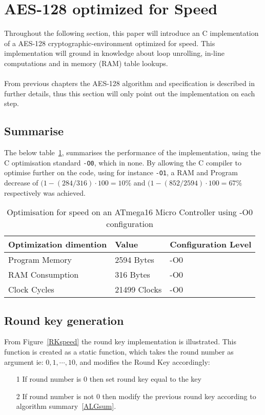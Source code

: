 \documentclass[Report.tex]{subfiles}
\begin{document}
\section{AES-128 optimized for Speed}
Throughout the following section, this paper will introduce 
an C implementation of a AES-128 cryptographic-environment optimized for speed.
This implementation will ground in knowledge about loop unrolling, in-line computations
and in memory (RAM) table lookups.
\\\\\noindent
From previous chapters the AES-128 algorithm and specification is described in further details,
thus this section will only point out the implementation on each step.

\subsection{Summarise}
The below table~\ref{OPTspeed}, summarises the performance of
the implementation, using the C optimisation standard \verb+-O0+, which in none.
By allowing the C compiler to optimise further on the code, using for instance \verb+-O1+,
a RAM and Program decrease of $(1-(284/316)\cdot100=10\%$ and $(1-(852/2594)\cdot100 = 67\%$
respectively was achieved.

\begin{table}[h]
\centering
    \begin{tabular}{|l|l|l|}
    \hline
    Optimization dimention 	& Value       			& Configuration Level 	\\ \hline
    Program Memory         	& 2594 Bytes   		& -O0                 		\\ \hline
    RAM Consumption        	& 316 Bytes    		& -O0                 		\\ \hline
    Clock Cycles           		& 21499 Clocks 		& -O0                 			\\ \hline
    \end{tabular}
    \caption{\label{OPTspeed} Optimisation for speed on an ATmega16 Micro Controller using -O0 configuration}
\end{table}


\subsection{Round key generation}
From Figure~\ref{RKspeed} the round key implementation is illustrated.
This function is created as a static function, which takes the round number as 
argument ie: $ 0, 1, \cdots, 10  $, and modifies the Round Key accordingly:
\begin{itemize}
\item[1] If round number is $0$ then set round key equal to the key
\item[2] If round number is not $0$ then modify the previous round key according to algorithm summary~\ref{ALGsum}.
\end{itemize}
\end{document}
